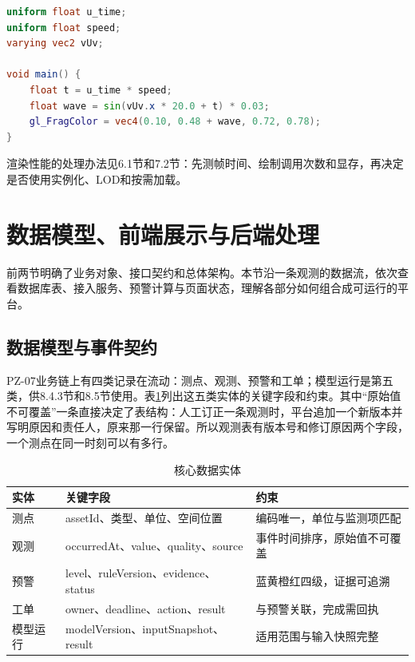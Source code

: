 \begin{lstlisting}[label={lst:ch08-glsl},language=GLSL,caption={水面颜色动画的片元着色器}]
uniform float u_time;
uniform float speed;
varying vec2 vUv;

void main() {
    float t = u_time * speed;
    float wave = sin(vUv.x * 20.0 + t) * 0.03;
    gl_FragColor = vec4(0.10, 0.48 + wave, 0.72, 0.78);
}
\end{lstlisting}

渲染性能的处理办法见6.1节和7.2节：先测帧时间、绘制调用次数和显存，再决定是否使用实例化、LOD和按需加载。

\section{数据模型、前端展示与后端处理}

前两节明确了业务对象、接口契约和总体架构。本节沿一条观测的数据流，依次查看数据库表、接入服务、预警计算与页面状态，理解各部分如何组合成可运行的平台。


\subsection{数据模型与事件契约}

PZ-07业务链上有四类记录在流动：测点、观测、预警和工单；模型运行是第五类，供8.4.3节和8.5节使用。表\ref{tab:case-core-data}列出这五类实体的关键字段和约束。其中“原始值不可覆盖”一条直接决定了表结构：人工订正一条观测时，平台追加一个新版本并写明原因和责任人，原来那一行保留。所以观测表有版本号和修订原因两个字段，一个测点在同一时刻可以有多行。

\begin{table}[htbp]
\centering
\caption{核心数据实体}
\label{tab:case-core-data}
\begin{tabular}{p{2.4cm}p{4.5cm}p{5.5cm}}
\toprule
实体 & 关键字段 & 约束 \\
\midrule
测点 & assetId、类型、单位、空间位置 & 编码唯一，单位与监测项匹配 \\
观测 & occurredAt、value、quality、source & 事件时间排序，原始值不可覆盖 \\
预警 & level、ruleVersion、evidence、status & 蓝黄橙红四级，证据可追溯 \\
工单 & owner、deadline、action、result & 与预警关联，完成需回执 \\
模型运行 & modelVersion、inputSnapshot、result & 适用范围与输入快照完整 \\
\bottomrule
\end{tabular}
\end{table}

